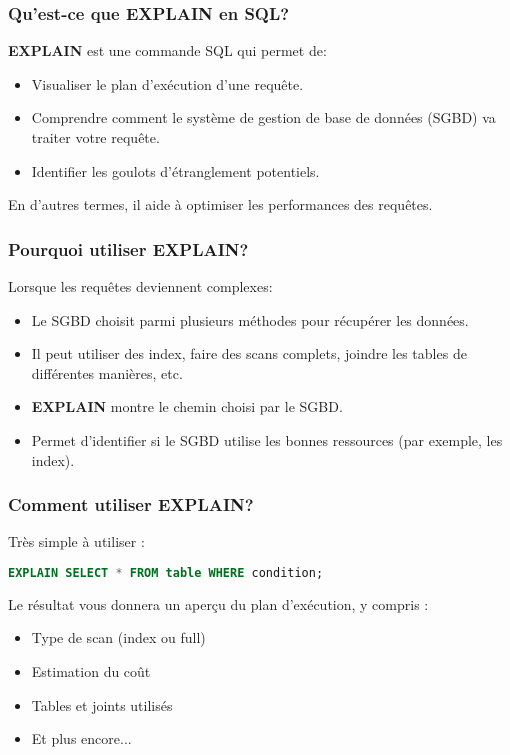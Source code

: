 \begin{frame}
  \frametitle{Qu'est-ce que EXPLAIN en SQL?}

  \textbf{EXPLAIN} est une commande SQL qui permet de:
  \begin{itemize}
    \item Visualiser le plan d'exécution d'une requête.
    \item Comprendre comment le système de gestion de base de données (SGBD) va traiter votre requête.
    \item Identifier les goulots d'étranglement potentiels.
  \end{itemize}

  En d'autres termes, il aide à optimiser les performances des requêtes.
\end{frame}

\begin{frame}
  \frametitle{Pourquoi utiliser EXPLAIN?}

  Lorsque les requêtes deviennent complexes:
  \begin{itemize}
    \item Le SGBD choisit parmi plusieurs méthodes pour récupérer les données.
    \item Il peut utiliser des index, faire des scans complets, joindre les tables de différentes manières, etc.
    \item \textbf{EXPLAIN} montre le chemin choisi par le SGBD.
    \item Permet d'identifier si le SGBD utilise les bonnes ressources (par exemple, les index).
  \end{itemize}
\end{frame}

\begin{frame}[fragile]
  \frametitle{Comment utiliser EXPLAIN?}

  Très simple à utiliser :
  \begin{lstlisting}[language=SQL]
EXPLAIN SELECT * FROM table WHERE condition;
  \end{lstlisting}

  Le résultat vous donnera un aperçu du plan d'exécution, y compris :
  \begin{itemize}
    \item Type de scan (index ou full)
    \item Estimation du coût
    \item Tables et joints utilisés
    \item Et plus encore...
  \end{itemize}
\end{frame}

